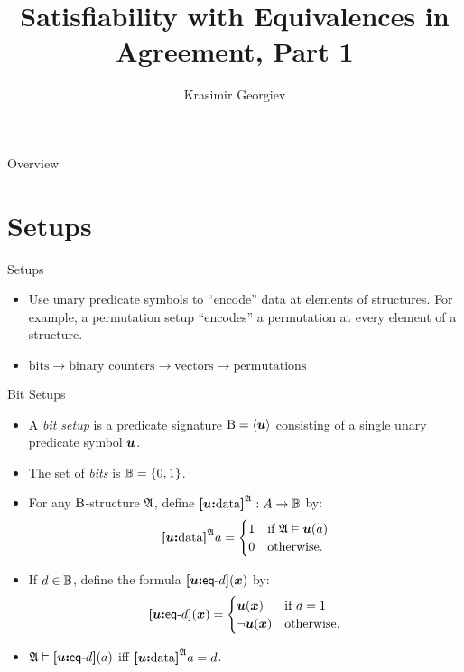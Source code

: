 \documentclass{beamer}
\begin{document}
\title{Satisfiability with Equivalences in Agreement, Part 1}
\author{Krasimir Georgiev}
\frame{\titlepage}

\begin{frame}{Overview}
\tableofcontents
\end{frame}

\section{Setups}
\begin{frame}{Setups}
\begin{itemize}
\item Use unary predicate symbols to ``encode'' data at elements of structures.
For example, a permutation setup ``encodes'' a permutation at every element of a
structure.
\item $\text{bits} \to \text{binary counters} \to \text{vectors} \to
\text{permutations}$
\end{itemize}
\end{frame}

\begin{frame}{Bit Setups}
\begin{itemize}
  \item A \emph{bit setup} is a predicate signature ${\mathrm{B}} = \left\langle \bm{u} \right\rangle$ consisting of a
  single unary predicate symbol $\bm{u}$.
  \item The set of \emph{bits} is $\mathbb{B} = \left\{0,1\right\}$.
  \item For any ${\mathrm{B}}$-structure $\mathfrak{A}$, define ${\bm{[}\bm{u}\mathord{\bm{:}}\mathrm{data}\bm{]}}^{\mathfrak{A}} : A\to\mathbb{B}$ by:
  \[
    {\bm{[}\bm{u}\mathord{\bm{:}}\mathrm{data}\bm{]}}^{\mathfrak{A}} a = \begin{cases}
      1 &\text{if } \mathfrak{A} \vDash \bm{u}(a) \\
      0 &\text{otherwise.}
    \end{cases}
  \]

  \item
  If $d\in\mathbb{B}$, define the formula ${\bm{[}\bm{u}\mathord{\bm{:}}\mathsf{eq}{\hbox{-}}d\bm{]}}(\bm{x})$ by:
  \[
  {\bm{[}\bm{u}\mathord{\bm{:}}\mathsf{eq}{\hbox{-}}d\bm{]}}(\bm{x}) = \begin{cases}
    \bm{u}(\bm{x}) &\text{if } d = 1 \\
    \lnot\bm{u}(\bm{x}) &\text{otherwise.}
  \end{cases}
  \]

  \item $\mathfrak{A}\vDash{\bm{[}\bm{u}\mathord{\bm{:}}\mathsf{eq}{\hbox{-}}d\bm{]}}(a)$ iff ${\bm{[}\bm{u}\mathord{\bm{:}}\mathrm{data}\bm{]}}^{\mathfrak{A}}a = d$.
\end{itemize}
\end{frame}
\end{document}
